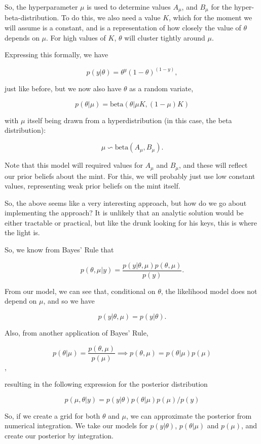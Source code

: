 \documentclass[10pt, a4paper]{article}
\begin{document}
So, the hyperparameter $\mu$ is used to determine values $A_\mu$, and
$B_\mu$ for the hyper-beta-distribution. To do this, we also need a
value $K$, which for the moment we will assume is a constant, and is a
representation of how closely the value of $\theta$ depends on
$\mu$. For high values of $K$, $\theta$ will cluster tightly around
$\mu$.

Expressing this formally, we have

\[ p(y|\theta) = \theta^y (1 - \theta)^{(1-y)} , \]

\noindent
just like before, but we now also have $\theta$ as a random variate,

\[ p(\theta | \mu) = \text{beta}(\theta | \mu K, (1 - \mu) K) \]

\noindent
with $\mu$ itself being drawn from a hyperdistribution (in this case, the
beta distribution):

\[ \mu \backsim \text{beta}(A_\mu, B_\mu). \]

Note that this model will required values for $A_\mu$ and $B_\mu$, and
these will reflect our prior beliefs about the mint. For this, we will
probably just use low constant values, representing weak prior beliefs
on the mint itself.

So, the above seems like a very interesting approach, but how do we go
about implementing the approach? It is unlikely that an analytic
solution would be either tractable or practical, but like the drunk
looking for his keys, this is where the light is.

So, we know from Bayes' Rule that

\[ p(\theta, \mu | y) = \frac{p(y | \theta, \mu) p(\theta, \mu)}{p(y)}. \]

\noindent
From our model, we can see that, conditional on $\theta$, the
likelihood model does not depend on $\mu$, and so we have

\[ p(y | \theta, \mu) = p(y | \theta). \]

\noindent
Also, from another application of Bayes' Rule,

\[ p(\theta | \mu) = \frac{p(\theta, \mu)}{p(\mu)} \implies
p(\theta, \mu) = p(\theta | \mu) p(\mu) \],

\noindent
resulting in the following expression for the posterior distribution

\[ p(\mu, \theta | y) = p(y | \theta) p(\theta | \mu) p(\mu) / p(y) \]



So, if we create a grid for both $\theta$ and $\mu$, we can
approximate the posterior from numerical integration. We take our
models for $p(y|\theta)$, $p(\theta|\mu)$ and $p(\mu)$, and create our
posterior by integration.
\end{document}
